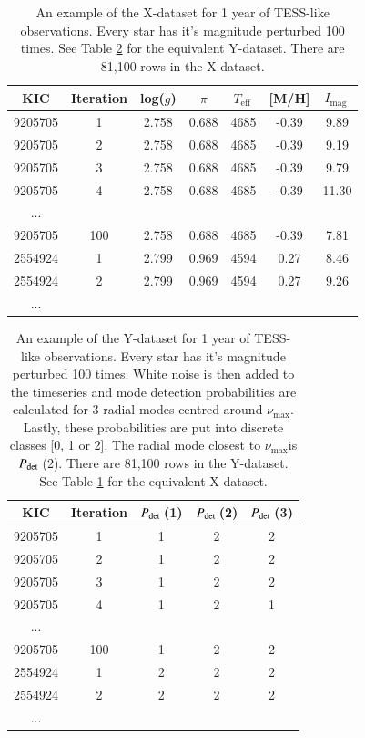 \documentclass[a4paper,fleqn,usenatbib,useAMS]{mnras}
\newcommand{\numax}{\ensuremath{\nu_{\textrm{max}}}}
\newcommand{\teff}{\ensuremath{T_{\textrm{eff}}\:}}
\newcommand{\pdet}{\ensuremath{P_{\rm det}\:}}
\newcommand{\imag}{\ensuremath{I_{\textrm{mag}}\:}}
\begin{document}
\begin{table}
\begin{center}
\begin{tabular}{|*{7}{c|}}
KIC     & Iteration & log($g$) & $\pi$ & \teff & [M/H] & \imag \\
\hline
9205705	& 1         & 2.758	& 0.688 & 4685 & -0.39 & 9.89  \\
9205705	& 2         & 2.758	& 0.688 & 4685 & -0.39 & 9.19  \\
9205705	& 3         & 2.758	& 0.688 & 4685 & -0.39 & 9.79  \\
9205705	& 4         & 2.758	& 0.688 & 4685 & -0.39 & 11.30 \\
...                                                        \\
9205705	& 100       & 2.758	& 0.688 & 4685 & -0.39 & 7.81  \\
2554924	& 1	        & 2.799	& 0.969 & 4594 &  0.27 & 8.46  \\
2554924	& 2         & 2.799	& 0.969 & 4594 &  0.27 & 9.26  \\
...                                                         \\
\hline
\end{tabular}
\end{center}
\caption{An example of the X-dataset for 1 year of TESS-like observations. Every star has it's magnitude perturbed 100 times. See Table \ref{tab: y dataset} for the equivalent Y-dataset. There are 81,100 rows in the X-dataset.}
\label{tab: x dataset}
\end{table}

\begin{table}
\begin{center}
\begin{tabular}{|*{5}{c|}}
KIC & Iteration & \pdet(1) & \pdet(2) & \pdet(3) \\
\hline
9205705	& 1     & 1 & 2 & 2 \\
9205705	& 2     & 1 & 2 & 2 \\
9205705	& 3     & 1 & 2 & 2 \\
9205705	& 4     & 1 & 2 & 1 \\
...                         \\
9205705	& 100   & 1 & 2 & 2 \\
2554924	& 1	    & 2 & 2 & 2 \\
2554924	& 2     & 2 & 2 & 2 \\
...                         \\
\hline
\end{tabular}
\end{center}
\caption{An example of the Y-dataset for 1 year of TESS-like observations. Every star has it's magnitude perturbed 100 times. White noise is then added to the timeseries and mode detection probabilities are calculated for 3 radial modes centred around \numax. Lastly, these probabilities are put into discrete classes [0, 1 or 2]. The radial mode closest to \numax is \pdet(2).  There are 81,100 rows in the Y-dataset. See Table \ref{tab: x dataset} for the equivalent X-dataset.}
\label{tab: y dataset}
\end{table}
\end{document}
